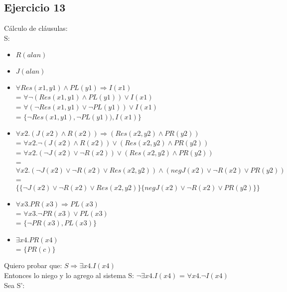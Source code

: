\documentclass[10pt,a4paper]{article}
\begin{document}
\subsection{Ejercicio 13}
Cálculo de cláusulas: \\
S:
\begin{itemize}
    \item $R(alan)$
    \item $J(alan)$
    \item $\forall Res(x1,y1) \land PL(y1) \Rightarrow I(x1)$ \\
    = $\forall \lnot (Res(x1,y1) \land PL(y1)) \lor I(x1)$ \\
    = $\forall (\lnot Res(x1,y1) \lor \lnot PL(y1)) \lor I(x1)$ \\
    = $\{ \lnot Res(x1,y1), \lnot PL(y1)), I(x1) \}$
    \item $\forall x2. (J(x2) \land R(x2)) \Rightarrow (Res(x2,y2) \land PR(y2))$ \\
    = $\forall x2. \lnot (J(x2) \land R(x2)) \lor (Res(x2,y2) \land PR(y2))$ \\
    = $\forall x2. (\lnot J(x2) \lor \lnot R(x2)) \lor (Res(x2,y2) \land PR(y2))$ \\
    = $\forall x2. (\lnot J(x2) \lor \lnot R(x2) \lor Res(x2,y2)) \land (neg J(x2) \lor \lnot R(x2) \lor PR(y2))$ \\
    = $\{\{\lnot J(x2) \lor \lnot R(x2) \lor Res(x2,y2)\}\{neg J(x2) \lor \lnot R(x2) \lor PR(y2)\}\}$
    \item $\forall x3. PR(x3) \Rightarrow PL(x3)$ \\
    = $\forall x3. \lnot PR(x3) \lor PL(x3)$  \\
    = $\{\lnot PR(x3), PL(x3)\}$
    \item $\exists x4. PR(x4)$ \\
    = $\{PR(c)\}$
\end{itemize}
Quiero probar que: $S \Rightarrow \exists x4. I(x4)$ \\
Entonces lo niego y lo agrego al sistema S: $\lnot \exists x4. I(x4)$ = $\forall x4. \lnot I(x4)$ \\
Sea S':
\end{document}
